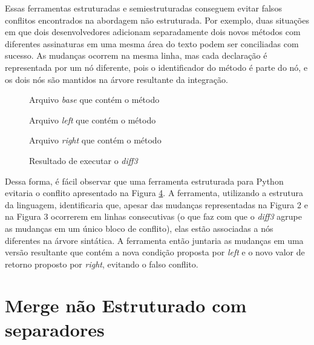 Essas ferramentas estruturadas e semiestruturadas conseguem evitar falsos conflitos
encontrados na abordagem não estruturada. Por exemplo, duas situações em
que dois desenvolvedores adicionam separadamente dois novos métodos com diferentes
assinaturas em uma mesma área do texto podem ser conciliadas com sucesso.
As mudanças ocorrem na mesma linha, mas cada declaração é representada por
um nó diferente, pois o identificador do método é parte do nó,
e os dois nós são mantidos na árvore resultante da integração.

\begin{figure}[ht]
\begin{center}
    
    \caption{Arquivo \emph{base} que contém o método }\label{base_example}
\end{center}
\end{figure}
\begin{figure}[ht]
\begin{center}
    
    \caption{Arquivo \emph{left} que contém o método }\label{left_example}
\end{center}
\end{figure}
\begin{figure}[ht]
\begin{center}
    
    \caption{Arquivo \emph{right} que contém o método }\label{right_example}
\end{center}
\end{figure}
\begin{figure}[ht]
\begin{center}
    
\end{center}
\caption{Resultado de executar o \emph{diff3}}\label{diff3_example}
\end{figure}

Dessa forma, é fácil observar que uma ferramenta estruturada para Python evitaria o
conflito apresentado na Figura \ref{diff3_example}. A ferramenta, utilizando a estrutura da
linguagem, identificaria que, apesar das mudanças representadas na Figura 2 e na
Figura 3 ocorrerem em linhas consecutivas (o que faz com que o \emph{diff3} agrupe as mudanças em um único bloco de conflito),
elas estão associadas a nós diferentes na árvore
sintática. A ferramenta então juntaria as mudanças em uma versão resultante que contém a
nova condição proposta por \emph{left} e o novo valor de retorno proposto por \emph{right},
evitando o falso conflito.

\section{Merge não Estruturado com separadores}
